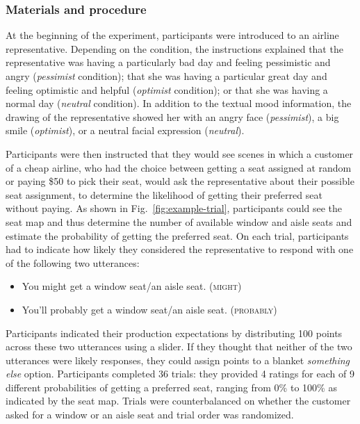 \documentclass[man,floatsintext]{apa6}
\newcommand{\jd}[1]{\textcolor{Purple}{\bf [jd: #1]}}
\begin{document}
\subsubsection{Materials and procedure}
At the beginning of the experiment, participants were introduced to an airline representative. Depending on the condition, the instructions explained that the representative was having a particularly bad day and feeling pessimistic and angry (\textit{pessimist} condition); that she was having a particular great day and feeling optimistic and helpful (\textit{optimist} condition); or that she was having a normal day (\textit{neutral} condition). In addition to the textual mood information, the drawing of the representative  showed her with an angry face (\textit{pessimist}), a big smile (\textit{optimist}), or a neutral facial expression (\textit{neutral}).

Participants were then instructed that they would see scenes in which a customer of a cheap airline, who had the choice between getting a seat assigned at random or paying \$50 to pick their seat, would ask the representative about their possible seat assignment, to determine the likelihood of getting their preferred seat without paying. As shown in Fig.~\ref{fig:example-trial}, participants could see the seat map and thus determine the number of available window and aisle seats and estimate the probability of getting the preferred seat. On each trial, participants had to indicate how likely they considered the representative to respond with one of the following two  utterances:

\begin{itemize}
    \item You might get a window seat/an aisle seat. (\textsc{might})
    \item You'll probably get a window seat/an aisle seat. (\textsc{probably})
\end{itemize}

Participants indicated their production expectations by distributing 100 points across these two utterances using a slider. If they thought that neither of the two utterances were likely responses, they could assign points to a blanket \textit{something else} option. Participants completed 36 trials: they provided  4 ratings for each of 9 different probabilities of getting a preferred seat, ranging from 0\% to 100\% as indicated by the seat map. Trials were counterbalanced on whether the customer asked for a window or an aisle seat and trial order was randomized.
\end{document}

